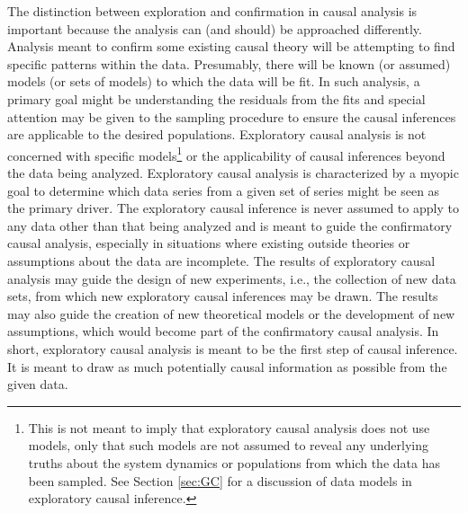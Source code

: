 \documentclass{article}[10pt]
\begin{document}
The distinction between exploration and confirmation in causal analysis is important because the analysis can (and should) be approached differently.  Analysis meant to confirm some existing causal theory will be attempting to find specific patterns within the data.  Presumably, there will be known (or assumed) models (or sets of models) to which the data will be fit.  In such analysis, a primary goal might be understanding the residuals from the fits and special attention may be given to the sampling procedure to ensure the causal inferences are applicable to the desired populations.  Exploratory causal analysis is not concerned with specific models\footnote{This is not meant to imply that exploratory causal analysis does not use models, only that such models are not assumed to reveal any underlying truths about the system dynamics or populations from which the data has been sampled.  See Section \ref{sec:GC} for a discussion of data models in exploratory causal inference.} or the applicability of causal inferences beyond the data being analyzed.  Exploratory causal analysis is characterized by a myopic goal to determine which data series from a given set of series might be seen as the primary driver.  The exploratory causal inference is never assumed to apply to any data other than that being analyzed and is meant to guide the confirmatory causal analysis, especially in situations where existing outside theories or assumptions about the data are incomplete.  The results of exploratory causal analysis may guide the design of new experiments, i.e., the collection of new data sets, from which new exploratory causal inferences may be drawn.  The results may also guide the creation of new theoretical models or the development of new assumptions, which would become part of the confirmatory causal analysis.  In short, exploratory causal analysis is meant to be the first step of causal inference.  It is meant to draw as much potentially causal information as possible from the given data.
\end{document}
